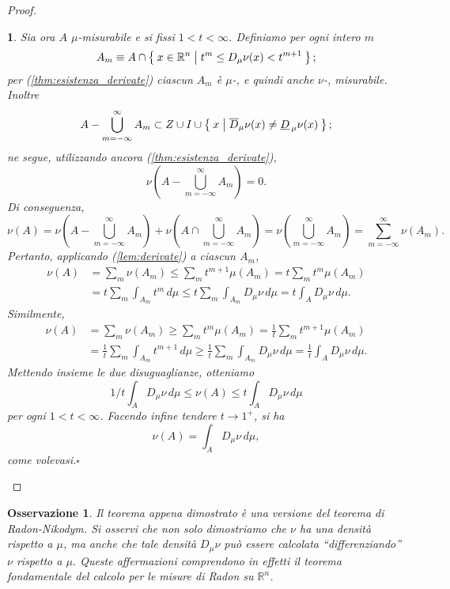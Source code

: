\documentclass[a4paper,10pt,openright,oneside]{book}
\theoremstyle{theoremstyle}
\theoremstyle{theoremstylewoheader}
\theoremstyle{theoremstyle}
\newtheorem{osservazione}[teorema]{Osservazione}
\theoremstyle{proofsecstyle}
\newtheorem{proofsec}{}
\theoremstyle{nonumberplain}
\newtheorem{proof}{Dim.}
\newcommand{\RR}{\ensuremath{\mathbb{R}}}
\newcommand{\lDer}[2]{\ensuremath{\underline{D}_{\,#2} #1}}
\newcommand{\uDer}[2]{\ensuremath{\overline{D}_#2 #1}}
\newcommand{\Der}[2]{\ensuremath{D_#2 #1}}
\renewcommand{\qedsymbol}{\ensuremath{\square}}
\newcommand{\qed}{\unskip\nobreak\hfill\nobreak\hspace{.5em}\qedsymbol}
\begin{document}
\begin{proof}
\begin{proofsec}
Sia ora $A$ $\mu$-misurabile e si fissi $1 < t < \infty$. Definiamo per ogni intero $m$
\[
A_m \equiv A \cap \Set{ x \in \RR^n | t^m \le \Der{\nu}{\mu} (x) < t^{m+1} };
\]
per (\ref{thm:esistenza_derivate}) ciascun $A_m$ è $\mu$-, e quindi anche $\nu$-, misurabile. Inoltre
\[
A - \bigcup_{m = -\infty}^\infty A_m \subset Z \cup I \cup \Set{ x | \uDer{\nu}{\mu}(x) \ne \lDer{\nu}{\mu}(x) };
\]
ne segue, utilizzando ancora (\ref{thm:esistenza_derivate}),
\[
\nu\left(A - \bigcup_{m = -\infty}^\infty A_m\right) = 0.
\]
Di conseguenza,
\[
\nu(A) = \nu\left(A - \bigcup_{m = -\infty}^\infty A_m\right) + \nu\left(A \cap \bigcup_{m = -\infty}^\infty A_m\right) = \nu\left(\bigcup_{m = -\infty}^\infty A_m\right) = \sum_{m=-\infty}^\infty \nu(A_m).
\]
Pertanto, applicando (\ref{lem:derivate}) a ciascun $A_m$,
\begin{align*}
\nu(A) &= \sum_m \nu(A_m) \le \sum_m t^{m+1} \mu(A_m) = t\sum_m t^m \mu(A_m)\\
&= t\sum_m \int_{A_m} t^m\, d\mu \le t\sum_m \int_{A_m} \Der{\nu}{\mu}\, d\mu = t\int_A \Der{\nu}{\mu}\, d\mu.
\end{align*}
Similmente,
\begin{align*}
\nu(A) &= \sum_m \nu(A_m) \ge \sum_m t^m \mu(A_m) = \frac{1}{t}\sum_m t^{m+1} \mu(A_m)\\
&= \frac{1}{t}\sum_m \int_{A_m} t^{m+1}\, d\mu \ge \frac{1}{t}\sum_m \int_{A_m} \Der{\nu}{\mu}\, d\mu = \frac{1}{t}\int_A \Der{\nu}{\mu}\, d\mu.
\end{align*}
Mettendo insieme le due disuguaglianze, otteniamo
\[
1/t \int_A \Der{\nu}{\mu}\, d\mu \le \nu(A) \le t\int_A \Der{\nu}{\mu}\, d\mu
\]
per ogni $1 < t < \infty$. Facendo infine tendere $t \to 1^+$, si ha
\[
\nu(A) = \int_A \Der{\nu}{\mu}\, d\mu,
\]
come volevasi.\qed
\end{proofsec}
\end{proof}

\begin{osservazione}
Il teorema appena dimostrato è una versione del \emph{teorema di Radon-Niko\-dym}. Si osservi che non solo dimostriamo che $\nu$ ha una densità rispetto a $\mu$, ma anche che tale densità $\Der{\nu}{\mu}$ può essere calcolata ``differenziando'' $\nu$ rispetto a $\mu$. Queste affermazioni comprendono in effetti il \emph{teorema fondamentale del calcolo} per le misure di Radon su $\RR^n$.
\end{osservazione}
\end{document}
